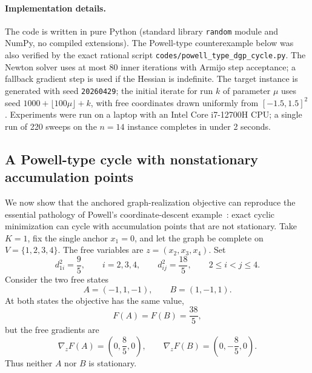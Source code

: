 \documentclass[11pt]{article}
\begin{document}
\paragraph{Implementation details.}
The code is written in pure Python (standard library \texttt{random} module and NumPy, no compiled extensions).  The Powell-type counterexample below was also verified by the exact rational script \texttt{codes/powell\_type\_dgp\_cycle.py}.  The Newton solver uses at most 80 inner iterations with Armijo step acceptance; a fallback gradient step is used if the Hessian is indefinite.  The target instance is generated with seed \texttt{20260429}; the initial iterate for run $k$ of parameter $\mu$ uses seed $1000+\lfloor100\mu\rfloor+k$, with free coordinates drawn uniformly from $[-1.5,1.5]^2$.  Experiments were run on a laptop with an Intel Core i7-12700H CPU; a single run of 220 sweeps on the $n=14$ instance completes in under 2 seconds.

\subsection{A Powell-type cycle with nonstationary accumulation points}
\label{subsec:powell-cycle}

We now show that the anchored graph-realization objective can reproduce the essential pathology of Powell's coordinate-descent example~\cite{powell1973}: exact cyclic minimization can cycle with accumulation points that are not stationary.  Take \(K=1\), fix the single anchor \(x_1=0\), and let the graph be complete on \(V=\{1,2,3,4\}\).  The free variables are \(z=(x_2,x_3,x_4)\).  Set
\[
    d_{1i}^2=\frac95,\qquad i=2,3,4,
    \qquad
    d_{ij}^2=\frac{18}{5},\qquad 2\le i<j\le4.
\]
Consider the two free states
\[
    A=(-1,1,-1),\qquad
    B=(1,-1,1).
\]
At both states the objective has the same value,
\[
    F(A)=F(B)=\frac{38}{5},
\]
but the free gradients are
\[
    \nabla_z F(A)=\left(0,\frac85,0\right),
    \qquad
    \nabla_z F(B)=\left(0,-\frac85,0\right).
\]
Thus neither \(A\) nor \(B\) is stationary.
\end{document}
